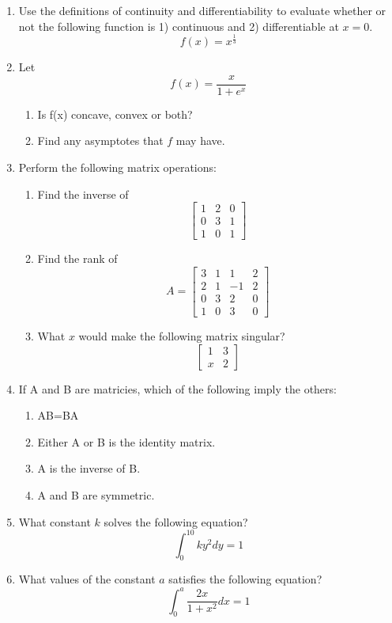 \documentclass[11pt]{article}
\begin{document}
\begin{enumerate}
\item Use the definitions of continuity and differentiability to evaluate whether or not the following function is 1) continuous and 2) differentiable at $x=0$.
$$f(x)=x^{\frac{1}{3}}$$



\vspace{.2in}
\item Let $$f(x)=\frac{x}{1+e^x}$$
\begin{enumerate}
\item Is f(x) concave, convex or both?
\item Find any asymptotes that $f$ may have.
\end{enumerate}

\item Perform the following matrix operations:

\begin{enumerate}
\item Find the inverse of $$\begin{bmatrix}1 & 2& 0\\ 0& 3& 1\\1&0&1
\end{bmatrix}$$


\item Find the rank of 
$$A=\begin{bmatrix} 
3& 1& 1&2\\
2& 1& -1&2\\
0& 3& 2&0\\
1& 0& 3&0
\end{bmatrix}$$


\item What $x$ would make the following matrix singular?
$$\begin{bmatrix}
1&3\\ x&2
\end{bmatrix}$$
\end{enumerate}

\vspace{.2in}

\item If A and B are matricies, which of the following imply the others: 
\begin{enumerate}
\item AB=BA
\item Either A or B is the identity matrix.
\item A is the inverse of B.
\item A and B are symmetric.
\end{enumerate}

\item What constant $k$ solves the following equation?
$$\int_0^{10} ky^2dy=1$$

\item What values of the constant $a$ satisfies the following equation?
$$\int_0^a \frac{2x}{1+x^2}dx=1$$


\end{enumerate}
\end{document}
